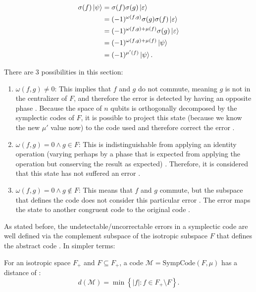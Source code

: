 \begin{align*}
  \sigma(f)\ket{\psi} &= \sigma(f)\sigma(g)\ket{\varepsilon}\\
  &= (-1)^{\omega(f, g)} \sigma(g) \sigma(f)\ket{\varepsilon}\\
  &= (-1)^{\omega(f, g) + \mu(f)} \sigma(g)\ket{\varepsilon}\\
  &= (-1)^{\omega(f, g) + \mu(f)} \ket{\psi}\\
  &= (-1)^{\mu'(f)} \ket{\psi}
.\end{align*}

There are 3 possibilities in this section:

\begin{enumerate}
  \item $\omega(f, g) \neq 0$: This implies that $f$ and $g$ do not commute, meaning $g$ is not in the centralizer of $F$, and therefore the error is detected by having an opposite phase \citep{Kitaev2002}. Because the space of $n$ qubits is orthogonally decomposed by the symplectic codes of $F$, it is possible to project this state (because we know the new $\mu'$ value now) to the code used and therefore correct the error \citep{Kitaev2002}.
  \item $\omega(f, g) = 0 \land g \in F$: This is indistinguishable from applying an identity operation (varying perhaps by a phase that is expected from applying the operation but conserving the result as expected) \citep{Kitaev2002}. Therefore, it is considered that this state has not suffered an error \citep{Kitaev2002}.
  \item $\omega(f, g) = 0 \land g \notin F$: This means that $f$ and $g$ commute, but the subspace that defines the code does not consider this particular error \citep{Kitaev2002}. The error maps the state to another congruent code to the original code \citep{Kitaev2002}.
\end{enumerate}

\begin{definition}
  As stated before, the undetectable/uncorrectable errors in a symplectic code are well defined via the complement subspace of the isotropic subspace $F$ that defines the abstract code \citep{Kitaev2002}. In simpler terms:

  For an isotropic space $F_+$ and $F \subseteq F_+$, a code $\mathcal{M} = \text{SympCode}(F, \mu)$ has a distance of \citep{Kitaev2002}:
  \begin{equation}
    d(\mathcal{M}) = \min\left\{|f| : f \in F_+ \setminus F \right\}
    \label{eq:distance_symplectic}
  .\end{equation}
\end{definition}
